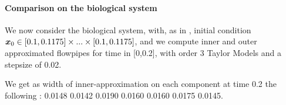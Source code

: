 
\paragraph{Comparison on the biological system}
We now consider the biological system, with, as in \cite{underapprox16}, initial condition $\x_0 \in [0.1,0.1175] \times...\times [0.1,0.1175]$, 
and we compute inner and outer approximated flowpipes for time in [0,0.2], 
with order 3 Taylor Models and a stepsize of 0.02.

We get as width of inner-approximation on each component at time 0.2 the following : 0.0148 0.0142 0.0190 0.0160 0.0160 0.0175 0.0145. 



